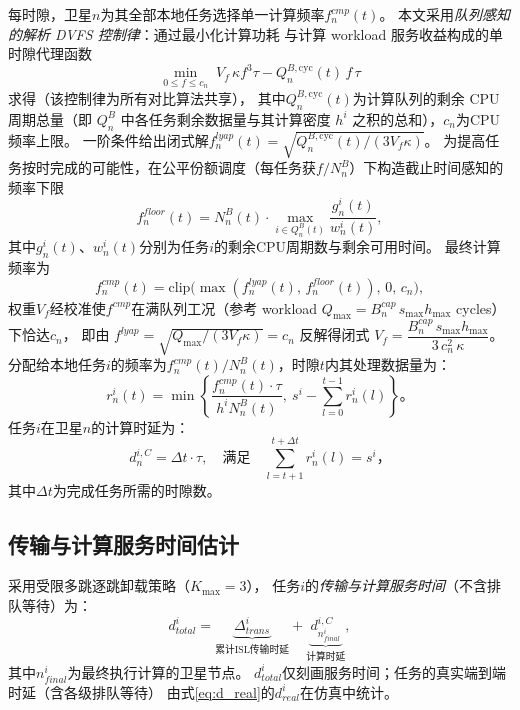 \documentclass[a4paper,11pt]{article}
\begin{document}
每时隙，卫星$n$为其全部本地任务选择单一计算频率$f^{cmp}_n(t)$。
本文采用\emph{队列感知的解析 DVFS 控制律}：通过最小化计算功耗
与计算 workload 服务收益构成的单时隙代理函数
\begin{equation}
    \min_{0 \le f \le c_n}\; V_f\,\kappa f^3\tau - Q^{B,\mathrm{cyc}}_n(t)\,f\,\tau
\end{equation}
求得（该控制律为所有对比算法共享），
其中$Q^{B,\mathrm{cyc}}_n(t)$为计算队列的剩余 CPU 周期总量（即 $Q^B_n$ 中各任务剩余数据量与其计算密度 $h^i$ 之积的总和），$c_n$为CPU频率上限。
一阶条件给出闭式解$f^{lyap}_n(t) = \sqrt{Q^{B,\mathrm{cyc}}_n(t)/(3 V_f \kappa)}$。
为提高任务按时完成的可能性，在公平份额调度（每任务获$f/N^B_n$）下构造截止时间感知的频率下限
\begin{equation}
    f^{floor}_n(t) = N^B_n(t)\cdot\max_{i \in Q^B_n(t)}
    \frac{g^i_n(t)}{w^i_n(t)},
\end{equation}
其中$g^i_n(t)$、$w^i_n(t)$分别为任务$i$的剩余CPU周期数与剩余可用时间。
最终计算频率为
\begin{equation}
    f^{cmp}_n(t) = \mathrm{clip}\!\big(\max(f^{lyap}_n(t),\, f^{floor}_n(t)),\, 0,\, c_n\big),
    \label{eq:cpu_alloc}
\end{equation}
权重$V_f$经校准使$f^{cmp}$在满队列工况（参考 workload
$Q_{\max}=B^{cap}_n\, s_{\max} h_{\max}$ cycles）下恰达$c_n$，
即由 $f^{lyap}=\sqrt{Q_{\max}/(3V_f\kappa)}=c_n$ 反解得闭式
$V_f = \dfrac{B^{cap}_n\, s_{\max} h_{\max}}{3\,c_n^2\,\kappa}$。
分配给本地任务$i$的频率为$f^{cmp}_n(t)/N^B_n(t)$，时隙$t$内其处理数据量为：
\begin{equation}
    r^i_n(t) = \min\!\left\{
    \frac{f^{cmp}_n(t) \cdot \tau}{h^i N^B_n(t)},~
    s^i - \sum_{l=0}^{t-1} r^i_n(l)\right\}。
    \label{eq:workload}
\end{equation}
任务$i$在卫星$n$的计算时延为：
\begin{equation}
    d^{i,C}_n = \Delta t \cdot \tau,\quad
    \text{满足}\quad
    \sum_{l=t+1}^{t+\Delta t} r^i_n(l) = s^i，
    \label{eq:comp_delay}
\end{equation}
其中$\Delta t$为完成任务所需的时隙数。

\subsection{传输与计算服务时间估计}

采用受限多跳逐跳卸载策略（$K_{\max}=3$），
任务$i$的\emph{传输与计算服务时间}（不含排队等待）为：
\begin{equation}
    d^i_{total} =
    \underbrace{\Delta^i_{trans}}_{\text{累计ISL传输时延}}
    + \underbrace{d^{i,C}_{n^i_{final}}}_{\text{计算时延}},
    \label{eq:e2e_delay}
\end{equation}
其中$n^i_{final}$为最终执行计算的卫星节点。
$d^i_{total}$仅刻画服务时间；任务的真实端到端时延（含各级排队等待）
由式\eqref{eq:d_real}的$d^i_{real}$在仿真中统计。
\end{document}
